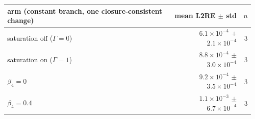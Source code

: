 \begin{tabular}{lrr}
\toprule
arm (constant branch, one closure-consistent change) & mean L2RE $\pm$ std & $n$ \\
\midrule
saturation off ($\Gamma=0$) & $6.1\times10^{-4}$ $\pm$ $2.1\times10^{-4}$ & 3 \\
saturation on ($\Gamma=1$) & $8.8\times10^{-4}$ $\pm$ $3.0\times10^{-4}$ & 3 \\
$\beta_4=0$ & $9.2\times10^{-4}$ $\pm$ $3.5\times10^{-4}$ & 3 \\
$\beta_4=0.4$ & $1.1\times10^{-3}$ $\pm$ $6.7\times10^{-4}$ & 3 \\
\bottomrule
\end{tabular}